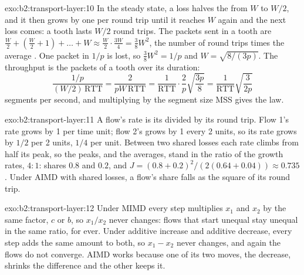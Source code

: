 \begin{solution}{exo:b2:transport-layer:10}
In the steady state, a loss halves the  from $W$ to $W/2$, and it then grows by one per round trip until it
reaches $W$ again and the next loss comes: a tooth lasts $W/2$ round trips. The packets sent in a tooth are $\frac W2
+ (\frac W2 + 1) + \dots + W \approx \frac W2 \cdot \frac{3W}{4} = \frac38 W^2$, the number of round trips times the
average . One packet in $1/p$ is lost, so $\frac38 W^2 = 1/p$ and $W = \sqrt{8/(3p)}$. The throughput is the
packets of a tooth over its duration:
\[
\frac{1/p}{(W/2)\,\mathrm{RTT}} = \frac{2}{pW\,\mathrm{RTT}} = \frac{1}{\mathrm{RTT}} \cdot \frac{2}{p}
\sqrt{\frac{3p}{8}} = \frac{1}{\mathrm{RTT}} \sqrt{\frac{3}{2p}}
\]
segments per second, and multiplying by the segment size MSS gives the law.
\end{solution}

\begin{solution}{exo:b2:transport-layer:11}
A flow's rate is its  divided by its round trip. Flow 1's rate grows by 1 per time unit; flow 2's  grows
by 1 every 2 units, so its rate grows by $1/2$ per 2 units, $1/4$ per unit. Between two shared losses each rate climbs
from half its peak, so the peaks, and the averages, stand in the ratio of the growth rates, $4 : 1$: shares $0.8$ and
$0.2$, and $J = (0.8 + 0.2)^2 / (2 (0.64 + 0.04)) \approx 0.735$. Under AIMD with shared losses, a flow's share falls as
the square of its round trip.
\end{solution}

\begin{solution}{exo:b2:transport-layer:12}
Under MIMD every step multiplies $x_1$ and $x_2$ by the same factor, $c$ or $b$, so $x_1/x_2$ never changes: flows that
start unequal stay unequal in the same ratio, for ever. Under additive increase and additive decrease, every step adds
the same amount to both, so $x_1 - x_2$ never changes, and again the flows do not converge. AIMD works because one of
its two moves, the decrease, shrinks the difference and the other keeps it.
\end{solution}

